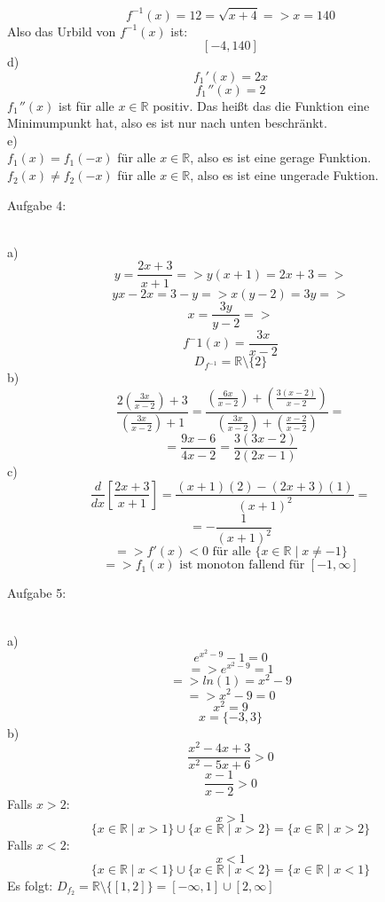 \documentclass[11pt]{article}
\begin{document}
				$$f^{-1}(x)=12=\sqrt{x+4} => x=140$$
				Also das Urbild von $f^{-1}(x)$ ist:\\
				$$[-4,140]$$
			\indent d)\\
				$$f_1 \hspace{1pt}'(x) = 2x$$
				$$f_1 \hspace{1pt}''(x) = 2$$
				$f_1 \hspace{1pt} ''(x)$ ist für alle $x \in \mathbb{R}$ positiv. Das heißt das die Funktion eine Minimumpunkt hat, also es ist nur nach unten beschränkt.\\
			\indent e)\\
				$f_1(x)=f_1(-x)$ für alle $x\in\mathbb{R}$, also es ist eine gerage Funktion.\\
				$f_2(x) \neq f_2(-x)$ für alle $x\in\mathbb{R}$, also es ist eine ungerade Fuktion.\\
		\noindent \begin{Large}Aufgabe 4:\end{Large}\\[2pt]
			\indent a)
				$$y=\frac{2x+3}{x+1} => y(x+1)=2x+3=>$$
				$$yx-2x=3-y => x(y-2)=3y=>$$
				$$x=\frac{3y}{y-2}=>$$
				$$f^-1(x)=\frac{3x}{x-2}$$
				$$D_{f^{-1}}=\mathbb{R}\setminus\{2\}$$
			\indent b)
				$$\frac{2\left(\frac{3x}{x-2}\right)+3}{\left(\frac{3x}{x-2}\right)+1}=\frac{\left(\frac{6x}{x-2}\right)+\left(\frac{3(x-2)}{x-2}\right)}{\left(\frac{3x}{x-2}\right)+\left(\frac{x-2}{x-2}\right)}=$$
				$$=\frac{9x-6}{4x-2}=\frac{3(3x-2)}{2(2x-1)}$$
			\indent c)
				$$\frac{d}{dx}\left[\frac{2x+3}{x+1}\right]=\frac{(x+1)(2)-(2x+3)(1)}{(x+1)^2}=$$
				$$=-\frac{1}{(x+1)^2}$$
				$$=> f'(x)<0  \mbox{ für alle } \{x \in \mathbb{R} \mid x \neq -1\}$$
				$$=> f_1(x) \mbox{ ist monoton fallend  für }[-1,\infty] $$		
		\noindent \begin{Large}Aufgabe 5:\end{Large}\\[2pt]
			\indent a)
				$$e^{x^2-9}-1=0$$
				$$=> e^{x^2-9}=1$$
				$$=>ln(1)=x^2-9$$
				$$=>x^2-9=0$$
				$$x^2=9$$
				$$x=\{-3,3\}$$
			\indent b)
						$$\frac{x^2-4x+3}{x^2-5x+6}>0$$
						$$\frac{x-1}{x-2}>0$$
					Falls $x>2$:
						$$x>1$$
						$$\{x \in \mathbb{R} \mid x>1\} \cup \{x \in \mathbb{R} \mid x>2\} = \{x \in \mathbb{R} \mid x>2 \}$$
					Falls $x<2$:
						$$x<1$$
						$$\{x \in \mathbb{R} \mid x<1\} \cup \{x \in \mathbb{R} \mid x<2\} = \{x \in \mathbb{R} \mid x<1 \}$$
					Es folgt: $D_{f_2} = \mathbb{R}\setminus\{[1,2]\} = [-\infty,1]\cup[2,\infty]$
\end{document}
